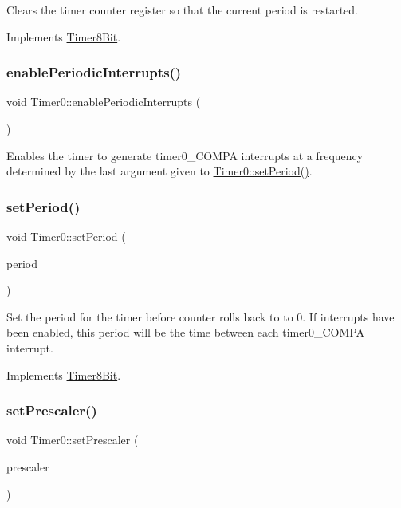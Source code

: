 Clears the timer counter register so that the current period is restarted. 

Implements \mbox{\hyperlink{class_timer8_bit}{Timer8\+Bit}}.

\mbox{\label{class_timer0_a8f0117cda8e82867d58725cf76a73686}} 
\subsubsection{\texorpdfstring{enable\+Periodic\+Interrupts()}{enablePeriodicInterrupts()}}
{\footnotesize\ttfamily void Timer0\+::enable\+Periodic\+Interrupts (\begin{DoxyParamCaption}{ }\end{DoxyParamCaption})}

Enables the timer to generate timer0\+\_\+\+C\+O\+M\+PA interrupts at a frequency determined by the last argument given to \mbox{\hyperlink{class_timer0_af19c7f55137a551a3e9ae1c6b15fd4c5}{Timer0\+::set\+Period()}}. \mbox{\label{class_timer0_af19c7f55137a551a3e9ae1c6b15fd4c5}} 
\subsubsection{\texorpdfstring{set\+Period()}{setPeriod()}}
{\footnotesize\ttfamily void Timer0\+::set\+Period (\begin{DoxyParamCaption}\item[{u8}]{period }\end{DoxyParamCaption})\hspace{0.3cm}{\ttfamily [virtual]}}

Set the period for the timer before counter rolls back to to 0. If interrupts have been enabled, this period will be the time between each timer0\+\_\+\+C\+O\+M\+PA interrupt. 

Implements \mbox{\hyperlink{class_timer8_bit}{Timer8\+Bit}}.

\mbox{\label{class_timer0_aaa42d8cd37a0f9f37d42bd4f1f6c91f8}} 
\subsubsection{\texorpdfstring{set\+Prescaler()}{setPrescaler()}}
{\footnotesize\ttfamily void Timer0\+::set\+Prescaler (\begin{DoxyParamCaption}\item[{Prescale\+Option}]{prescaler }\end{DoxyParamCaption})\hspace{0.3cm}{\ttfamily [virtual]}}

